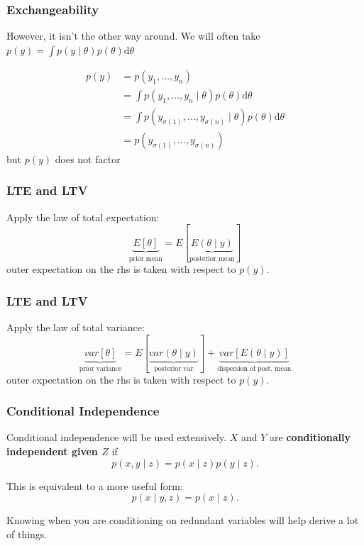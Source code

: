 \documentclass{beamer}
\begin{document}
\begin{frame}
\frametitle{Exchangeability}

However, it isn't the other way around. We will often take $p(y) = \int p(y \mid \theta) p(\theta) \text{d}\theta$

\begin{align*}
p(y) &= p(y_1, \ldots, y_n) \\
&= \int p(y_1, \ldots, y_n \mid \theta) p(\theta) \text{d}\theta \\
&= \int p(y_{\sigma(1)}, \ldots, y_{\sigma(n)} \mid \theta) p(\theta) \text{d}\theta \\
&= p(y_{\sigma(1)}, \ldots, y_{\sigma(n)})
\end{align*}
 but $p(y)$ does not factor

\end{frame}

\begin{frame}
\frametitle{LTE and LTV}

Apply the law of total expectation:
\[
\underbrace{E[\theta]}_{\text{prior mean}} = E[\underbrace{E(\theta \mid y)}_{\text{posterior mean}}]
\]
outer expectation on the rhs is taken with respect to $p(y)$.

\end{frame}

\begin{frame}
\frametitle{LTE and LTV}

Apply the law of total variance:
\[
\underbrace{var[\theta]}_{\text{prior variance}} = E[\underbrace{var(\theta \mid y)}_{\text{posterior var}}] + \underbrace{var[E(\theta \mid y)]}_{\text{dispersion of post. mean}}
\]
outer expectation on the rhs is taken with respect to $p(y)$.

\end{frame}

\begin{frame}
\frametitle{Conditional Independence}

Conditional independence will be used extensively. $X$ and $Y$ are {\bf conditionally independent given $Z$} if $$
p(x,y \mid z) = p(x \mid z) p(y \mid z).
$$

This is equivalent to a more useful form:
$$
p(x \mid y, z) = p(x \mid z).
$$

Knowing when you are conditioning on redundant variables will help derive a lot of things.

\end{frame}
\end{document}
